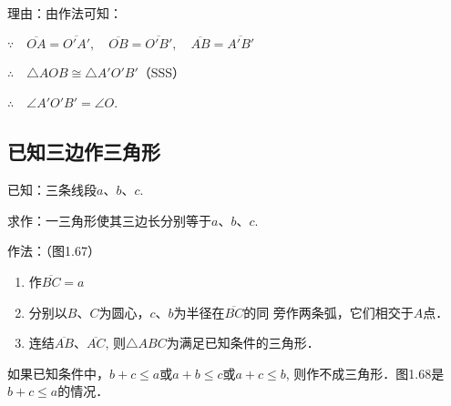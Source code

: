 理由：由作法可知：

$\because\quad \overline{OA}=\overline{O'A'},\quad \overline{OB}=\overline{O'B'},\quad \overline{AB}=\overline{A'B'}$

$\therefore\quad \triangle AOB\cong \triangle A'O'B'$（SSS）

$\therefore\quad \angle A'O'B'=\angle O$.

\subsection{已知三边作三角形}

已知：三条线段$a$、$b$、$c$.

求作：一三角形使其三边长分别等于$a$、$b$、$c$.
\begin{figure}[htp]
	\centering
{}
	\caption{}
\end{figure}


作法：（图1.67）
\begin{enumerate}
	\item 作$\overline{BC}=a$
	\item 分别以$B$、$C$为圆心，$c$、$b$为半径在$\overline{BC}$的同
	旁作两条弧，它们相交于$A$点．
	\item 连结$\overline{AB}$、$\overline{AC}$, 则$\triangle ABC$为满足已知条件的三角形．
\end{enumerate}

\begin{rmk}
	如果已知条件中，$b+c\le a$或$a+b\le c$或$a+c\le 
b$, 则作不成三角形．图1.68是$b+c\le a$的情况．
\end{rmk}

